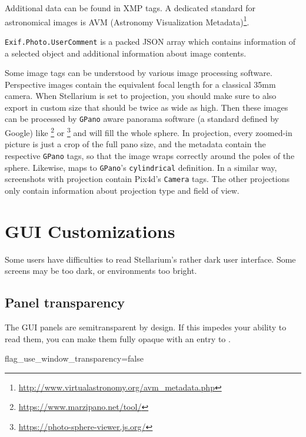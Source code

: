 Additional data can be found in XMP tags. A dedicated standard for astronomical images is 
AVM (Astronomy Visualization Metadata)\footnote{\url{http://www.virtualastronomy.org/avm_metadata.php}}. 

\texttt{Exif.Photo.UserComment} is a packed JSON array which contains information of a selected object and additional information about image contents. 

Some image tags can be understood by various image processing software. 
Perspective images contain the equivalent focal length for a classical 35mm camera. 
When Stellarium is set to  projection, 
you should make sure to also export in custom size that should be twice as wide as high. 
Then these images can be processed by \texttt{GPano} aware panorama software (a standard defined by Google) like 
\footnote{\url{https://www.marzipano.net/tool/}} or 
\footnote{\url{https://photo-sphere-viewer.js.org/}} and will fill the whole sphere.
In  projection, every zoomed-in picture is just a crop of the full pano size, 
and the metadata contain the respective \texttt{GPano} tags, so that the image wraps correctly around the poles of the sphere. 
Likewise,  maps to \texttt{GPano}'s \texttt{cylindrical} definition.
In a similar way, screenshots with  projection contain Pix4d's \texttt{Camera} tags. 
The other projections only contain information about projection type and field of view. 


\section{GUI Customizations}

Some users have difficulties to read Stellarium's rather dark user
interface. Some screens may be too dark, or environments too
bright. 

\subsection{Panel transparency}
\label{sec:CommandLineOptions:Special:PanelTransparency}
The GUI panels are semitransparent by design. If this impedes your ability to read them, you can 
make them fully opaque with an entry to .
\begin{configfile}
[gui]
flag_use_window_transparency=false
\end{configfile}

